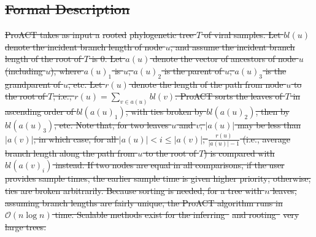 \documentclass[a4paper,11pt]{article}
\newcommand{\bigO}{\mathcal{O}}
\newcommand{\D}{D}
\newcommand{\ta}[1][A]{t'}
\newcommand{\tb}{t'}
\providecommand{\DIFdel}[1]{{\protect\color{red}\sout{#1}}}                      %
\providecommand{\DIFdelbegin}{} %
\providecommand{\DIFdelend}{} %
\begin{document}
\DIFdelbegin \subsection{\DIFdel{Formal Description}}
\addtocounter{subsection}{-1}%
\DIFdel{ProACT takes as input a }%
\DIFdel{rooted}%
\DIFdel{phylogenetic tree $T$ of viral samples. %
Let $bl(u)$ denote the incident branch length of node $u$,
and assume the incident branch length of the root of $T$ is 0.
Let $a(u)$ denote the vector of ancestors of node $u$ (including $u$),
where $a(u)_1$ is $u$,
$a(u)_2$ is the parent of $u$,
$a(u)_3$ is the grandparent of $u$, etc.
Let $r(u)$ denote the length of the path from node $u$ to the root of $T$,
i.e., $r(u)=\sum_{v\in a(u)}{bl(v)}$.
ProACT sorts the leaves of $T$ in ascending order of $bl(a(u)_1)$,
with ties broken by $bl(a(u)_2)$, then by $bl(a(u)_3)$, etc.
Note that, for two leaves $u$ and $v$,
$|a(u)|$ may be less than $|a(v)|$,
in which case, for all $|a(u)|<i\le|a(v)|$,
$\frac{r(u)}{|a(u)|-1}$ (i.e., average branch length along the path from $u$ to the root of $T$) is compared with $bl(a(v)_i)$ instead.
If two nodes are equal in all comparisons, if the user provides sample times, the earlier sample time is given higher priority; otherwise, ties are broken arbitrarily.
Because sorting is needed, for a tree with $n$ leaves,
assuming branch lengths are fairly unique,
the ProACT algorithm runs in $\bigO(n\log n)$ time. Scalable methods exist  for the inferring~}%
\DIFdel{and rooting~}%
\DIFdel{very large trees.
}\DIFdelend %
\end{document}
